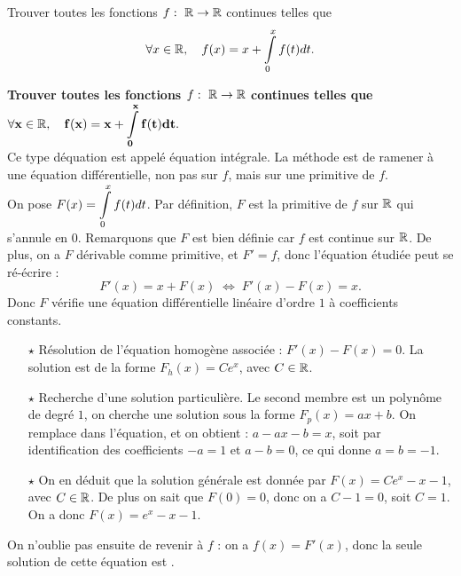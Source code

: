 \documentclass[a4paper, 11pt,reqno]{article}
\begin{document}
\begin{exercice}  \;
Trouver toutes les fonctions $f:\ \R\rightarrow \R$ continues telles que
$$\forall x\in\mathbb{R},\quad f(x)=x+\int\limits_0^x f(t)dt.  $$
\end{exercice}
\begin{correction}  \;
\textbf{Trouver toutes les fonctions $f:\ \R\rightarrow \R$ continues telles que $\mathbf{\forall \displaystyle x\in\mathbb{R},\quad f(x)=x+\int\limits_0^x f(t)dt.}$}\\
Ce type d\'equation est appel\'e \'equation int\'egrale. La m\'ethode est de ramener \`a une \'equation diff\'erentielle, non pas sur $f$, mais sur une primitive de $f$.\\
On pose $F(x) = \displaystyle \int\limits_0^x f(t)dt$. Par d\'efinition, $F$ est la primitive de $f$ sur $\mathbb{R}$ qui s'annule en $0$. Remarquons que $F$ est bien d\'efinie car $f$ est continue sur $\mathbb{R}$. De plus, on a $F$ d\'erivable comme primitive, et $F'= f$, donc l'\'equation \'etudi\'ee peut se r\'e-\'ecrire :
$$F'(x) = x + F(x) \; \Leftrightarrow \; F'(x) - F(x) = x.$$
Donc $F$ v\'erifie une \'equation diff\'erentielle lin\'eaire d'ordre $1$ \`a coefficients constants.
\begin{itemize}
\item[$\star$] R\'esolution de l'\'equation homog\`ene associ\'ee : $F'(x) - F(x) = 0$. La solution est de la forme $F_h(x) = C e^{x}$, avec $C\in \mathbb{R}$.
\item[$\star$] Recherche d'une solution particuli\`ere. Le second membre est un polyn\^ome de degr\'e $1$, on cherche une solution sous la forme $F_p(x) = a x+ b$. On remplace dans l'\'equation, et on obtient : $ a - ax - b = x$, soit par identification des coefficients $-a=1$ et $a-b=0$, ce qui donne $a=b=-1$.
\item[$\star$] On en d\'eduit que la solution g\'en\'erale est donn\'ee par $F(x) = C e^x -x-1$, avec $C \in \mathbb{R}$. De plus on sait que $F(0)=0$, donc on a $C-1=0$, soit $C=1$. On a donc $F(x) = e^x-x-1$.
\end{itemize}
On n'oublie pas ensuite de revenir \`a $f$ : on a $f(x) = F'(x)$, donc la seule solution de cette \'equation est .
\end{correction}
\end{document}
